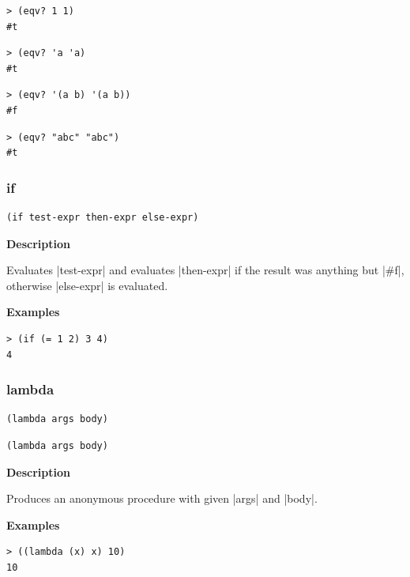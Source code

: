\documentclass[a4paper]{article}
\begin{document}
\begin{lstlisting}
> (eqv? 1 1)
#t
\end{lstlisting}

\begin{lstlisting}
> (eqv? 'a 'a)
#t
\end{lstlisting}

\begin{lstlisting}
> (eqv? '(a b) '(a b))
#f
\end{lstlisting}

\begin{lstlisting}
> (eqv? "abc" "abc")
#t
\end{lstlisting}

\subsubsection{if}

\begin{lstlisting}[frame=none]
(if test-expr then-expr else-expr)
\end{lstlisting}

\textbf{Description}

Evaluates |test-expr| and evaluates |then-expr| if the result was anything but |#f|, otherwise |else-expr| is evaluated.

\textbf{Examples}

\begin{lstlisting}
> (if (= 1 2) 3 4)
4
\end{lstlisting}

\subsubsection{lambda}

\begin{lstlisting}[frame=none,belowskip=0pt]
(lambda args body)
\end{lstlisting}
\begin{lstlisting}[frame=none,language=SchemeLambda,aboveskip=0pt]
(lambda args body)
\end{lstlisting}

\textbf{Description}

Produces an anonymous procedure with given |args| and |body|.

\textbf{Examples}

\begin{lstlisting}
> ((lambda (x) x) 10)
10
\end{lstlisting}
\end{document}
